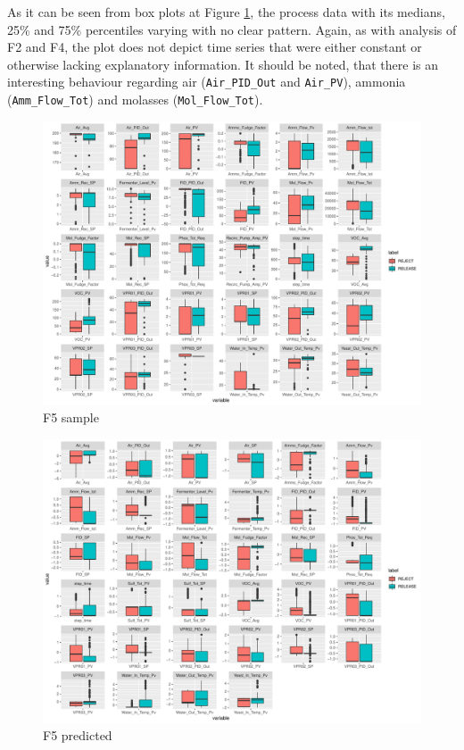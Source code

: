 As it can be seen from box plots at Figure \ref{fig:f5_sample}, the process data with its medians, 25\% and 75\% percentiles varying with no clear pattern. Again, as with analysis of F2 and F4, the plot does not depict time series that were either constant or otherwise lacking explanatory information. It should be noted, that there is an interesting behaviour regarding air (\texttt{Air\_PID\_Out} and \texttt{Air\_PV}), ammonia (\texttt{Amm\_Flow\_Tot}) and molasses (\texttt{Mol\_Flow\_Tot}). 

\begin{figure}[ht!]
    \centering
    \includegraphics[width=1.0\textwidth]{plots/f5-sample.pdf}
    \caption{F5 sample}
    \label{fig:f5_sample}
\end{figure}

\begin{figure}[ht!]
    \centering
    \includegraphics[width=1.0\textwidth]{plots/f5-predicted.pdf}
    \caption{F5 predicted}
    \label{fig:f5_predicted}
\end{figure}

